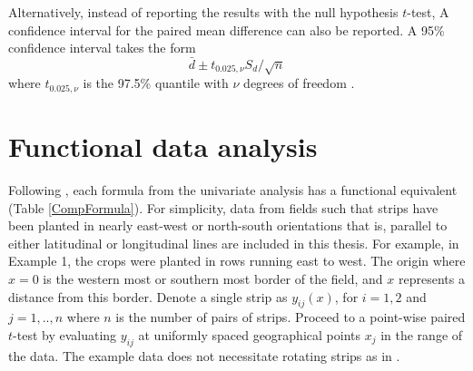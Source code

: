 \documentclass[phdcss]{SDSUThesis}
\begin{document}
Alternatively, instead of reporting the results with the null hypothesis $t$-test, A confidence interval for the paired mean difference can also be reported. A 95\% confidence interval takes the form
\begin{equation}
   \bar{d} \pm t_{0.025,\nu} S_d / \sqrt{n}
\end{equation}
where $t_{0.025,\nu}$ is the 97.5\% quantile with $\nu$ degrees of freedom .





\clearpage

\section{Functional data analysis}

Following \cite{ramsay-2005}, each formula from the univariate analysis has a functional equivalent (Table \ref{CompFormula}). For simplicity, data from fields such that strips have been planted in nearly east-west or north-south orientations  that is, parallel to either latitudinal or longitudinal lines are included in this thesis. For example, in Example 1, the crops were planted in rows running east to west. The origin where $x=0$ is the western most or southern most border of the field, and $x$ represents a distance from this border.  Denote a single strip as $y_{ij}(x)$, for $i=1,2$ and $j=1,..,n$ where $n$ is the number of pairs of strips. Proceed to a point-wise paired $t$-test by evaluating $y_{ij}$ at uniformly spaced geographical points $x_j$ in the range of the data. The example data does not necessitate rotating strips as in \cite{marchant-2019}.
\end{document}
